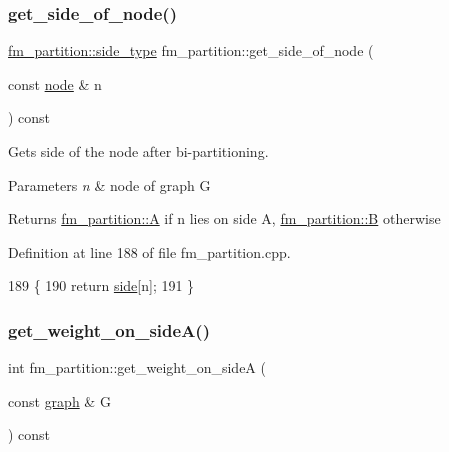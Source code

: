 \subsubsection{\texorpdfstring{get\+\_\+side\+\_\+of\+\_\+node()}{get\_side\_of\_node()}}
{\footnotesize\ttfamily \mbox{\hyperlink{classfm__partition_a7cdff1bea3740a287387e8408e16ca79}{fm\+\_\+partition\+::side\+\_\+type}} fm\+\_\+partition\+::get\+\_\+side\+\_\+of\+\_\+node (\begin{DoxyParamCaption}\item[{const \mbox{\hyperlink{classnode}{node}} \&}]{n }\end{DoxyParamCaption}) const}

Gets side of the node after bi-\/partitioning.


\begin{DoxyParams}{Parameters}
{\em n} & node of graph {\ttfamily G} \\
\hline
\end{DoxyParams}
\begin{DoxyReturn}{Returns}
{\ttfamily \mbox{\hyperlink{classfm__partition_a738e75c601403754e61e6dac623fd3ab}{fm\+\_\+partition\+::A}}} if {\ttfamily n} lies on side {\ttfamily A}, {\ttfamily \mbox{\hyperlink{classfm__partition_a42515c44eecb7ba3e2ec549a877ef238}{fm\+\_\+partition\+::B}}} otherwise 
\end{DoxyReturn}


Definition at line 188 of file fm\+\_\+partition.\+cpp.


\begin{DoxyCode}
189 \{
190     \textcolor{keywordflow}{return} \mbox{\hyperlink{classfm__partition_af83309e781e9658fc0ff923ced087bfc}{side}}[n];
191 \}
\end{DoxyCode}
\mbox{\label{classfm__partition_a3f1ddcff1ba7a4c4090f947f918b5331}} 
\subsubsection{\texorpdfstring{get\+\_\+weight\+\_\+on\+\_\+side\+A()}{get\_weight\_on\_sideA()}}
{\footnotesize\ttfamily int fm\+\_\+partition\+::get\+\_\+weight\+\_\+on\+\_\+sideA (\begin{DoxyParamCaption}\item[{const \mbox{\hyperlink{classgraph}{graph}} \&}]{G }\end{DoxyParamCaption}) const}


